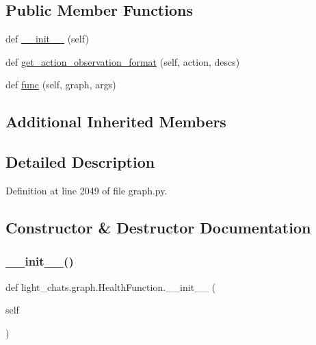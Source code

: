 \subsection*{Public Member Functions}
\begin{DoxyCompactItemize}
\item 
def \hyperlink{classlight__chats_1_1graph_1_1HealthFunction_a523a336bf9edf8f3fd8bc2afa400e633}{\+\_\+\+\_\+init\+\_\+\+\_\+} (self)
\item 
def \hyperlink{classlight__chats_1_1graph_1_1HealthFunction_a436cadbb6f2ae2cb77521c013caa8063}{get\+\_\+action\+\_\+observation\+\_\+format} (self, action, descs)
\item 
def \hyperlink{classlight__chats_1_1graph_1_1HealthFunction_aa79079c84c63fb936ef8ed5afa5bafca}{func} (self, graph, args)
\end{DoxyCompactItemize}
\subsection*{Additional Inherited Members}


\subsection{Detailed Description}


Definition at line 2049 of file graph.\+py.



\subsection{Constructor \& Destructor Documentation}
\mbox{\label{classlight__chats_1_1graph_1_1HealthFunction_a523a336bf9edf8f3fd8bc2afa400e633}} 
\subsubsection{\texorpdfstring{\+\_\+\+\_\+init\+\_\+\+\_\+()}{\_\_init\_\_()}}
{\footnotesize\ttfamily def light\+\_\+chats.\+graph.\+Health\+Function.\+\_\+\+\_\+init\+\_\+\+\_\+ (\begin{DoxyParamCaption}\item[{}]{self }\end{DoxyParamCaption})}



